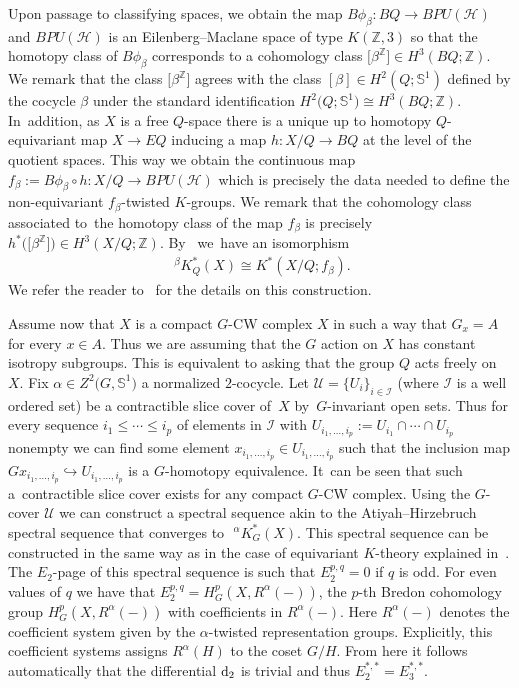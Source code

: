 \documentclass[pdftex]{sigma}
\def\Z{\mathbb{Z}}
\def\S{\mathbb{S}}
\newcommand{\cali}{\mathcal{I}}
\newcommand{\calu}{\mathcal{U}}
\newcommand{\calh}{\mathcal{H}}
\theoremstyle{definition}
\numberwithin{equation}{section}
\begin{document}
Upon passage to classifying spaces, we obtain the map $B\phi_{\beta}\colon BQ\to BPU(\calh)$
and $BPU(\calh)$ is an Eilenberg--Maclane space of type $K(\Z,3)$ so that the homotopy class of
$B\phi_{\beta}$ corresponds to a cohomology class $\big[\beta^\Z\big]\in H^{3}(BQ;\Z)$. We remark
that the class $\big[\beta^\Z\big]$ agrees with the class $[\beta]\in H^{2}(Q;\S^{1})$ defined by the
cocycle $\beta$ under the standard identification $H^{2}\big(Q;\S^{1}\big)\cong H^{3}(BQ;\Z)$. In~addition,
as $X$ is a free $Q$-space there is a unique up to homotopy $Q$-equivariant map $X \to EQ$ inducing
a map $h\colon X/Q \to BQ$ at the level of the quotient spaces. This way we obtain the continuous
map $f_{\beta}:=B\phi_\beta\circ h\colon X/Q\to BPU(\calh)$ which is precisely
the data needed to define the non-equivariant $f_{\beta}$-twisted $K$-groups. We remark
that the cohomology class associated to~the homotopy class of the map $f_{\beta}$ is precisely
$h^{*}\big(\big[\beta^\Z\big]\big)\in H^{3}(X/Q;\Z)$. By~\cite[equation~(3.6)]{GomezUribe} we~have an isomorphism
\begin{gather}\label{eqvsnoneq}
\phantom{i}^{\beta}K_{Q}^{\ast}(X)\cong K^{*}(X/Q;f_{\beta}).
\end{gather}
We refer the reader to~\cite[Section 3]{GomezUribe} for the details on this construction.

Assume now that $X$ is a compact $G$-CW complex $X$ in such a way that $G_{x}=A$ for every $x\in A$.
Thus we are assuming that the $G$ action on $X$ has constant isotropy subgroups.
This is equivalent to asking that the group $Q$ acts freely on $X$. Fix $\alpha\in Z^2\big(G,\S^{1}\big)$
a normalized $2$-cocycle. Let $\calu=\{U_{i}\}_{i\in \cali}$ (where $\cali$ is a well
ordered set) be a contractible slice cover of~$X$ by~$G$-invariant open sets.
Thus for every sequence $i_{1}\le \cdots\le i_{p}$ of elements in $\cali$ with
$U_{i_{1},\dots,i_{p}}:=U_{i_{1}}\cap\cdots\cap U_{i_{p}}$ nonempty
we can find some element $x_{i_{1},\dots,i_{p}}\in U_{i_{1},\dots, i_{p}}$
such that the inclusion map
$Gx_{i_{1},\dots,i_{p}}\hookrightarrow U_{i_{1},\dots,i_{p}}$ is a
$G$-homotopy equivalence. It~can be seen that such a~contractible slice cover exists
for any compact $G$-CW complex. Using the $G$-cover $\calu$ we can construct a spectral sequence
akin to the Atiyah--Hirzebruch spectral sequence that converges to $\phantom{i}^{\alpha}K_{G}^{\ast}(X)$.
This spectral sequence can be constructed in the same way as in the case of equivariant $K$-theory
explained in~\cite[Section 5]{Segal-Classifying}. The $E_{2}$-page of this
spectral sequence is such that $E_2^{p,q}=0$ if $q$ is odd. For even values of $q$ we have that
$E_2^{p,q}=H^p_G(X, R^{\alpha}(-))$, the $p$-th Bredon cohomology group $H^p_G(X, R^{\alpha}(-))$
with coefficients in $R^{\alpha}(-)$. Here $R^{\alpha}(-)$ denotes the coefficient system given by the
$\alpha$-twisted representation groups. Explicitly, this coefficient
systems assigns $R^{\alpha}(H)$ to the coset $G/H$. From here it follows automatically that the
differential ${\rm d}_{2}$ is trivial and thus $E^{*,*}_{2}=E^{*,*}_{3}$.
\end{document}
